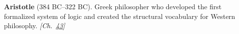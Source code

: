 \textbf{Aristotle} (384 BC–322 BC). Greek philosopher who developed the first formalized system of logic and created the structural vocabulary for Western philosophy. \emph{[Ch.~\hyperref[ch:nearflatuniverse]{43}]}

